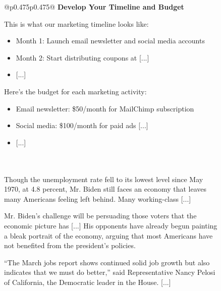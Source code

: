 \begin{figure}[p]
\begin{tabular}{@{}p{}p{}@{}}
    \textbf{Develop Your Timeline and Budget}

    This is what our marketing timeline looks like:
    \begin{itemize}[leftmargin=8pt]
        \item Month 1: Launch email newsletter and social media accounts
        \item Month 2: Start distributing coupons at \textcolor[HTML]{808080}{[...]}
        \item \textcolor[HTML]{808080}{[...]}
    \end{itemize}

    Here's the budget for each marketing activity:

    \begin{itemize}[leftmargin=8pt]
        \item Email newsletter: \$50/month for MailChimp subscription
        \item Social media: \$100/month for paid ads
        \textcolor[HTML]{808080}{[...]}
        \item \textcolor[HTML]{808080}{[...]}
    \end{itemize}\\
    \midrule
    \\
    \midrule
    Though the unemployment rate fell to its lowest level since May 1970, at 4.8 percent, Mr. Biden still faces an economy that leaves many Americans feeling left behind. Many working-class \textcolor[HTML]{808080}{[...]}
    
    Mr. Biden’s challenge will be persuading those voters that the economic picture has \textcolor[HTML]{808080}{[...]} His opponents have already begun painting a bleak portrait of the economy, arguing that most Americans have not benefited from the president’s policies.
    
    “The March jobs report shows continued solid job growth but also indicates that we must do better,” said Representative Nancy Pelosi of California, the Democratic leader in the House. \textcolor[HTML]{808080}{[...]}
    

\end{tabular}
\end{figure}

